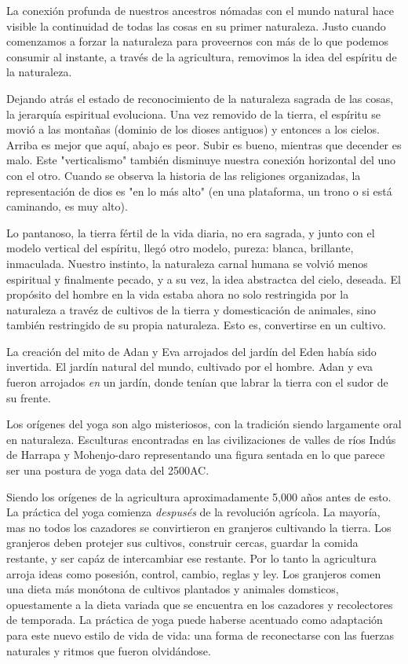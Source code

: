 La conexión profunda de nuestros ancestros nómadas con el mundo natural hace visible la continuidad de todas las cosas en su primer naturaleza. Justo cuando comenzamos a forzar la naturaleza para proveernos con más de lo que podemos consumir al instante, a través de la agricultura, removimos la idea del espíritu de la naturaleza.

Dejando atrás el estado de reconocimiento de la naturaleza sagrada de las cosas, la jerarquía espiritual evoluciona. Una vez removido de la tierra, el espíritu se movió a las montañas (dominio de los dioses antiguos) y entonces a los cielos. Arriba es mejor que aquí, abajo es peor. Subir es bueno, mientras que decender es malo. Este "verticalismo" tambi\'en disminuye nuestra conexión horizontal del uno con el otro. Cuando se observa la historia de las religiones organizadas, la representación de dios es "en lo más alto" (en una plataforma, un trono o si está caminando, es muy alto).

Lo pantanoso, la tierra f\'ertil de la vida diaria, no era sagrada, y junto con el modelo vertical del espíritu, llegó otro modelo, pureza: blanca, brillante, inmaculada. Nuestro instinto, la naturaleza carnal humana se volvió menos espiritual y finalmente pecado, y a su vez, la idea abstractca del cielo, deseada. El propósito del hombre en la vida estaba ahora no solo restringida por la naturaleza a trav\'ez de cultivos de la tierra y domesticación de animales, sino tambi\'en restringido de su propia naturaleza. Esto es, convertirse en un cultivo.

La creación del mito de Adan y Eva arrojados del jardín del Eden había sido invertida. El jardín natural del mundo, cultivado por el hombre. Adan y eva fueron arrojados \textit{en} un jardín, donde tenían que labrar la tierra con el sudor de su frente.

Los orígenes del yoga son algo misteriosos, con la tradición siendo largamente oral en naturaleza. Esculturas encontradas en las civilizaciones de valles de ríos Indús de Harrapa y Mohenjo-daro representando una figura sentada en lo que parece ser una postura de yoga data del 2500AC.

Siendo los orígenes de la agricultura aproximadamente 5,000 años antes de esto. La práctica del yoga comienza \textit{despus\'es} de la revolución agrícola. La mayoría, mas no todos los cazadores se convirtieron en granjeros cultivando la tierra. Los granjeros deben protejer sus cultivos, construir cercas, guardar la comida restante, y ser capáz de intercambiar ese restante. Por lo tanto la agricultura arroja ideas como posesión, control, cambio, reglas y ley. Los granjeros comen una dieta más monótona de cultivos plantados y animales domsticos, opuestamente a la dieta variada que se encuentra en los cazadores y recolectores de temporada. La práctica de yoga puede haberse acentuado como adaptación para este nuevo estilo de vida de vida: una forma de reconectarse con las fuerzas naturales y ritmos que fueron olvidándose.

